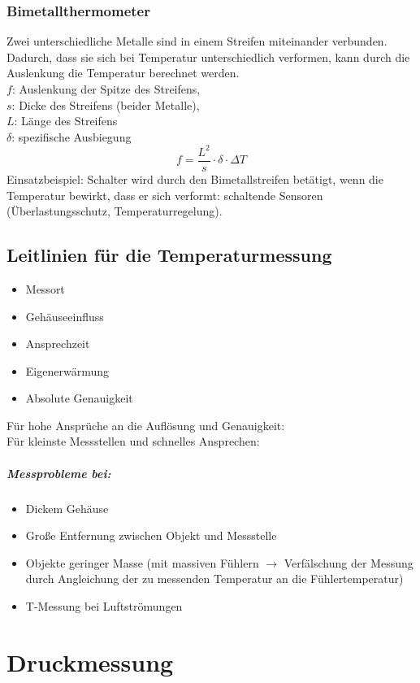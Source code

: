 \documentclass{scrreprt}
\begin{document}
\subsection{Bimetallthermometer}
Zwei unterschiedliche Metalle sind in einem Streifen miteinander verbunden. Dadurch, dass sie sich bei Temperatur unterschiedlich verformen, kann durch die Auslenkung die Temperatur berechnet werden.\\
$f$: Auslenkung der Spitze des Streifens,\\
$s$: Dicke des Streifens (beider Metalle),\\
$L$: Länge des Streifens\\
$\delta$: spezifische Ausbiegung
$$f=\frac{L^2}{s}\cdot \delta \cdot \Delta T$$
Einsatzbeispiel: Schalter wird durch den Bimetallstreifen betätigt, wenn die Temperatur bewirkt, dass er sich verformt: schaltende Sensoren (Überlastungsschutz, Temperaturregelung).

\section{Leitlinien für die Temperaturmessung}
\begin{itemize}
\item Messort
\item Gehäuseeinfluss
\item Ansprechzeit
\item Eigenerwärmung
\item Absolute Genauigkeit
\end{itemize}
Für hohe Ansprüche an die Auflösung und Genauigkeit: \\
Für kleinste Messstellen und schnelles Ansprechen: 
\paragraph{Messprobleme bei:}
\begin{itemize}
\item Dickem Gehäuse
\item Große Entfernung zwischen Objekt und Messstelle
\item Objekte geringer Masse (mit massiven Fühlern $\to$ Verfälschung der Messung durch Angleichung der zu messenden Temperatur an die Fühlertemperatur)
\item T-Messung bei Luftströmungen
\end{itemize}

\chapter{Druckmessung}
\end{document}
